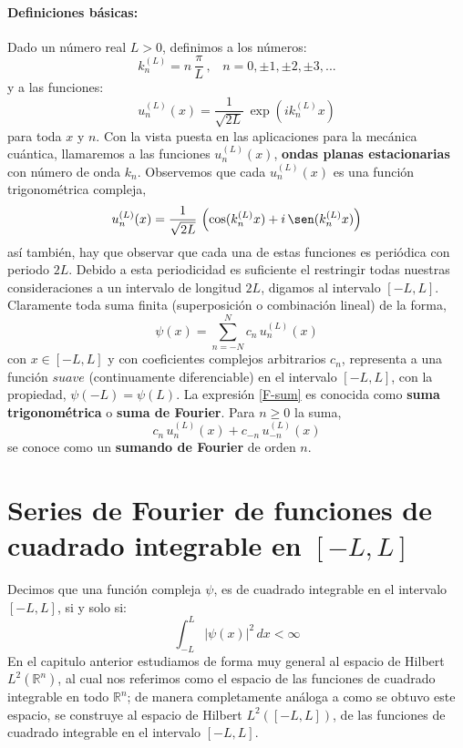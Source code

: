 \documentclass[12pt]{book}
\numberwithin{equation}{chapter}
\def\R{\mathbb{R}}
\begin{document}
\paragraph{Definiciones b\'asicas:} Dado un n\'umero real $L >0$, definimos a los n\'umeros:
\begin{equation}
k_{n}^{(L)} = n\, \frac{\pi}{L} \,,\,\,\,\,\, n =0,\pm1,\pm2,\pm3,...
\end{equation}
y a las funciones:
\begin{equation}\label{o-plan}
u_{n}^{(L)}(x)= \frac{1}{\sqrt{2L}}\, \exp ( i k_{n}^{(L)} x )
\end{equation}
para toda $x$ y $n$. Con la vista puesta en las aplicaciones para la mec\'anica cu\'antica, llamaremos a las funciones $u_{n}^{(L)}(x)$, {\bf ondas planas estacionarias} con n\'umero de onda $k_{n}$. Observemos que cada $u_{n}^{(L)}(x)$ es una funci\'on trigonom\'etrica compleja,
$$ u_{n}^{(L)}(x)= \frac{1}{\sqrt{2L}}\, \left( \cos(k_{n}^{(L)} x) + i\, \sen (k_{n}^{(L)} x)  \right) $$
as\'i tambi\'en, hay que observar que cada una de estas funciones es peri\'odica con periodo $2L$. Debido a esta periodicidad es suficiente el restringir todas nuestras consideraciones a un intervalo de longitud $2L$, digamos al intervalo $[-L,L]$.\\

Claramente toda suma finita (superposici\'on o combinaci\'on lineal) de la forma,
\begin{equation}\label{F-sum}
\psi(x)= \sum_{n=-N}^{N} c_{n}\, u_{n}^{(L)}(x) 
\end{equation}
con $x \in [-L,L]$ y con coeficientes complejos arbitrarios $c_{n}$, representa a una funci\'on $suave$ (continuamente diferenciable) en el intervalo $[-L,L]$, con la propiedad, $\psi(-L)= \psi(L)$. La expresi\'on \eqref{F-sum} es conocida como {\bf suma trigonom\'etrica} o {\bf suma de Fourier}. Para $n \geq 0$ la suma,
\begin{equation}
c_{n}\, u_{n}^{(L)}(x) + c_{-n}\, u_{-n}^{(L)}(x)
\end{equation}
se conoce como un {\bf sumando de Fourier} de orden $n$.

\vspace{15 mm}

\section{Series de Fourier de funciones de cuadrado integrable en $[-L,L]$}
Decimos que una funci\'on compleja $\psi$, es de cuadrado integrable en el intervalo $[-L,L]$, si y solo si:
$$ \int_{-L}^{L} |\psi(x)|^{2}\, dx < \infty $$
En el capitulo anterior estudiamos de forma muy general al espacio de Hilbert $L^{2}(\R^{n})$, al cual nos referimos como el espacio de las funciones de cuadrado integrable en todo $\R^{n}$; de manera completamente an\'aloga a como se obtuvo este espacio, se construye al espacio de Hilbert $L^{2}([-L,L])$, de las funciones de cuadrado integrable en el intervalo $[-L,L]$.\\
\end{document}
